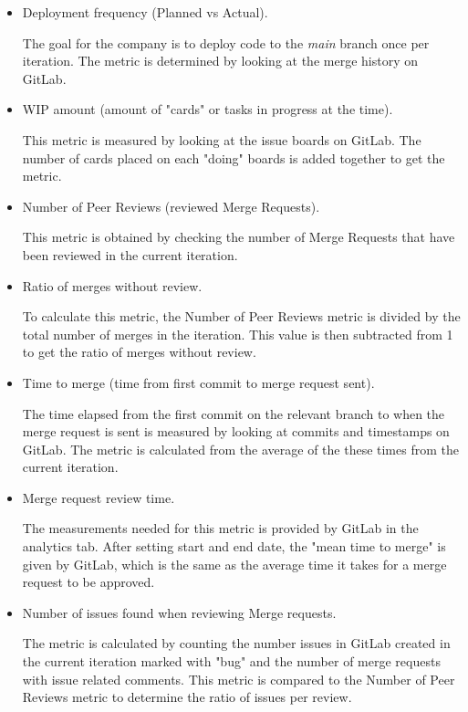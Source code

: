 \begin{itemize}
    \item Deployment frequency (Planned vs Actual).
    
    The goal for the company is to deploy code to the \emph{main} branch once per iteration. The metric is determined by looking at the merge history on GitLab.
    
    \item WIP amount (amount of "cards" or tasks in progress at the time).
    
    This metric is measured by looking at the issue boards on GitLab. The number of cards placed on each "doing" boards is added together to get the metric. 
    
    \item Number of Peer Reviews (reviewed Merge Requests).
    
    This metric is obtained by checking the number of Merge Requests that have been reviewed in the current iteration.
    
    \item Ratio of merges without review.
    
    To calculate this metric, the Number of Peer Reviews metric is divided by the total number of merges in the iteration. This value is then subtracted from 1 to get the ratio of merges without review.
    
    \item Time to merge (time from first commit to merge request sent).
    
    The time elapsed from the first commit on the relevant branch to when the merge request is sent is measured by looking at commits and timestamps on GitLab. The metric is calculated from the average of the these times from the current iteration. 
    
    \item Merge request review time.
    
    The measurements needed for this metric is provided by GitLab in the analytics tab. After setting start and end date, the "mean time to merge" is given by GitLab, which is the same as the average time it takes for a merge request to be approved. 
    
    \item Number of issues found when reviewing Merge requests.
    
    The metric is calculated by counting the number issues in GitLab created in the current iteration marked with "bug" and the number of merge requests with issue related comments. This metric is compared to the Number of Peer Reviews metric to determine the ratio of issues per review.
\end{itemize}


